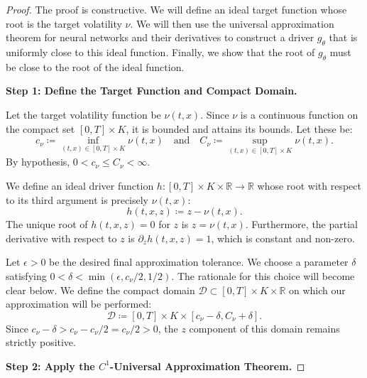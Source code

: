 \documentclass[qian]{imsart}
\newcommand{\R}{\mathbb{R}}
\theoremstyle{plain}
\theoremstyle{definition}
\begin{document}
\begin{proof}
The proof is constructive. We will define an ideal target function whose root is the target volatility $\nu$. We will then use the universal approximation theorem for neural networks and their derivatives to construct a driver $g_\theta$ that is uniformly close to this ideal function. Finally, we show that the root of $g_\theta$ must be close to the root of the ideal function.

\textbf{Step 1: Define the Target Function and Compact Domain.}

Let the target volatility function be $\nu(t,x)$. Since $\nu$ is a continuous function on the compact set $[0,T] \times K$, it is bounded and attains its bounds. Let these be:
\[
c_\nu \coloneqq \inf_{(t,x) \in [0,T] \times K} \nu(t,x) \quad \text{and} \quad
C_\nu \coloneqq \sup_{(t,x) \in [0,T] \times K} \nu(t,x).
\]
By hypothesis, $0 < c_\nu \le C_\nu < \infty$.

We define an ideal driver function $h: [0,T] \times K \times \R \to \R$ whose root with respect to its third argument is precisely $\nu(t,x)$:
\[
h(t,x,z) \coloneqq z - \nu(t,x).
\]
The unique root of $h(t,x,z)=0$ for $z$ is $z=\nu(t,x)$. Furthermore, the partial derivative with respect to $z$ is $\partial_z h(t,x,z) = 1$, which is constant and non-zero.

Let $\epsilon > 0$ be the desired final approximation tolerance. We choose a parameter $\delta$ satisfying $0 < \delta < \min(\epsilon, c_\nu/2, 1/2)$. The rationale for this choice will become clear below. We define the compact domain $\mathcal{D} \subset [0,T] \times K \times \R$ on which our approximation will be performed:
\[
\mathcal{D} \coloneqq [0,T] \times K \times [c_\nu - \delta, C_\nu + \delta].
\]
Since $c_\nu - \delta > c_\nu - c_\nu/2 = c_\nu/2 > 0$, the $z$ component of this domain remains strictly positive.

\textbf{Step 2: Apply the $C^1$-Universal Approximation Theorem.}


\end{proof}
\end{document}
